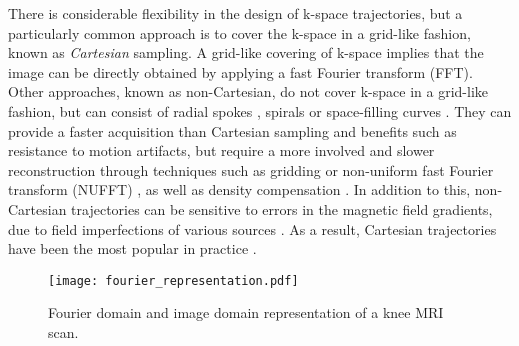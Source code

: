 There is considerable flexibility in the design of k-space trajectories, but a particularly common approach is to cover the k-space in a grid-like fashion, known as \textit{Cartesian} sampling. A grid-like covering of k-space implies that the image can be directly obtained by applying a fast Fourier transform (FFT). Other approaches, known as non-Cartesian, do not cover k-space in a grid-like fashion, but can consist of radial spokes \citep{lauterbur1973image}, spirals \citep{meyer1992fast} or space-filling curves \citep{lazarus2019sparkling}. They can provide a faster acquisition than Cartesian sampling and benefits such as resistance to motion artifacts, but require a more involved and slower reconstruction through techniques such as gridding \citep{o1985fast,jackson1991selection} or non-uniform fast Fourier transform (NUFFT) \citep{fessler2003nonuniform}, as well as density compensation \citep{pipe1999sampling,pauly2007non}. In addition to this, non-Cartesian trajectories can be sensitive to errors in the magnetic field gradients, due to field imperfections of various sources \citep{vannesjo2013gradient}. As a result, Cartesian trajectories have been the most popular in practice \citep{lustig2008compressed,feng2016compressed}.




\begin{figure}[!t]
    \centering
    \texttt{[image: fourier\_representation.pdf]}
    \caption{Fourier domain and image domain representation of a knee MRI scan.}\label{fig:fourier_representation}
\end{figure}

